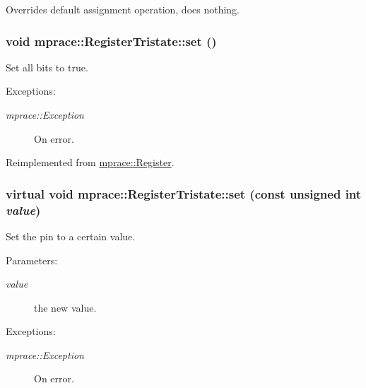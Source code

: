 Overrides default assignment operation, does nothing. 

\hypertarget{classmprace_1_1RegisterTristate_a6}{
\subsubsection[set]{\setlength{\rightskip}{0pt plus 5cm}void mprace::Register\-Tristate::set ()}}
\label{classmprace_1_1RegisterTristate_a6}


Set all bits to true. 

\begin{Desc}
\item[Exceptions:]
\begin{description}
\item[{\em mprace::Exception}]On error.\end{description}
\end{Desc}


Reimplemented from \hyperlink{classmprace_1_1Register_a3}{mprace::Register}.\hypertarget{classmprace_1_1RegisterTristate_a2}{
\subsubsection[set]{\setlength{\rightskip}{0pt plus 5cm}virtual void mprace::Register\-Tristate::set (const unsigned int {\em value})}}
\label{classmprace_1_1RegisterTristate_a2}


Set the pin to a certain value. 

\begin{Desc}
\item[Parameters:]
\begin{description}
\item[{\em value}]the new value. \end{description}
\end{Desc}
\begin{Desc}
\item[Exceptions:]
\begin{description}
\item[{\em mprace::Exception}]On error.\end{description}
\end{Desc}


